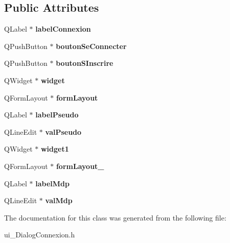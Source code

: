 \subsection*{Public Attributes}
\begin{DoxyCompactItemize}
\item 
Q\-Label $\ast$ {\bfseries label\-Connexion}\label{class_ui___dialog_connexion_ad90d75071d6c9d6e5539a7115156f5eb}

\item 
Q\-Push\-Button $\ast$ {\bfseries bouton\-Se\-Connecter}\label{class_ui___dialog_connexion_a5c7679d0477929e0d177aa38f9277f62}

\item 
Q\-Push\-Button $\ast$ {\bfseries bouton\-S\-Inscrire}\label{class_ui___dialog_connexion_a11208b09a06acbe25a6c352bdd4c0b3b}

\item 
Q\-Widget $\ast$ {\bfseries widget}\label{class_ui___dialog_connexion_a4a92db6b6c407d070d333bd7d5c9c442}

\item 
Q\-Form\-Layout $\ast$ {\bfseries form\-Layout}\label{class_ui___dialog_connexion_aeddc51c77c362a789e75246e03e62713}

\item 
Q\-Label $\ast$ {\bfseries label\-Pseudo}\label{class_ui___dialog_connexion_a10c9345fc39e8cc6c73531d688ff13ae}

\item 
Q\-Line\-Edit $\ast$ {\bfseries val\-Pseudo}\label{class_ui___dialog_connexion_a4560ad500c66e02c38d52f01b71c5c8b}

\item 
Q\-Widget $\ast$ {\bfseries widget1}\label{class_ui___dialog_connexion_a8e6e3dc050656a4747792c9497efa4f7}

\item 
Q\-Form\-Layout $\ast$ {\bfseries form\-Layout\-\_}\label{class_ui___dialog_connexion_ad824817e926068b482b4bf73f9632086}

\item 
Q\-Label $\ast$ {\bfseries label\-Mdp}\label{class_ui___dialog_connexion_aa6e5c9b46e3423bd6427192e6fd499a1}

\item 
Q\-Line\-Edit $\ast$ {\bfseries val\-Mdp}\label{class_ui___dialog_connexion_ae59151879eebdd101eaae39a532cdff8}

\end{DoxyCompactItemize}


The documentation for this class was generated from the following file\-:\begin{DoxyCompactItemize}
\item 
ui\-\_\-\-Dialog\-Connexion.\-h\end{DoxyCompactItemize}
